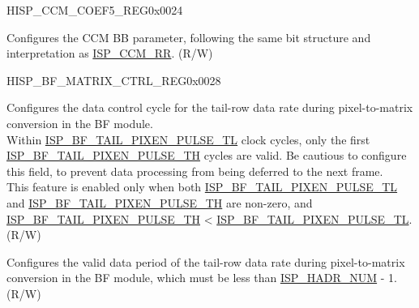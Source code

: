 \begin{register}{H}{ISP\_CCM\_COEF5\_REG}{0x0024}\label{regdesc:ISPCCMCOEF5REG}
%
%
\regnewline%
\begin{regdesc}\begin{reglist}
\label{fielddesc:ISPCCMBB}\item [ISP\_CCM\_BB] Configures the CCM BB parameter, following the same bit structure and interpretation as \hyperref[fielddesc:ISPCCMRR]{ISP\_CCM\_RR}. (R/W)
\end{reglist}\end{regdesc}
\end{register}


\begin{register}{H}{ISP\_BF\_MATRIX\_CTRL\_REG}{0x0028}\label{regdesc:ISPBFMATRIXCTRLREG}
%
%
%
%
%
\regnewline%
\begin{regdesc}\begin{reglist}
\label{fielddesc:ISPBFTAILPIXENPULSETL}\item [ISP\_BF\_TAIL\_PIXEN\_PULSE\_TL] Configures the data control cycle for the tail-row data rate during pixel-to-matrix conversion in the BF module.\\Within \hyperref[fielddesc:ISPBFTAILPIXENPULSETL]{ISP\_BF\_TAIL\_PIXEN\_PULSE\_TL} clock cycles, only the first \hyperref[fielddesc:ISPBFTAILPIXENPULSETH]{ISP\_BF\_TAIL\_PIXEN\_PULSE\_TH} cycles are valid. Be cautious to configure this field, to prevent data processing from being deferred to the next frame.\\This feature is enabled only when both \hyperref[fielddesc:ISPBFTAILPIXENPULSETL]{ISP\_BF\_TAIL\_PIXEN\_PULSE\_TL} and \hyperref[fielddesc:ISPBFTAILPIXENPULSETH]{ISP\_BF\_TAIL\_PIXEN\_PULSE\_TH} are non-zero, and \hyperref[fielddesc:ISPBFTAILPIXENPULSETH]{ISP\_BF\_TAIL\_PIXEN\_PULSE\_TH} < \hyperref[fielddesc:ISPBFTAILPIXENPULSETL]{ISP\_BF\_TAIL\_PIXEN\_PULSE\_TL}. (R/W)
\label{fielddesc:ISPBFTAILPIXENPULSETH}\item [ISP\_BF\_TAIL\_PIXEN\_PULSE\_TH] Configures the valid data period of the tail-row data rate during pixel-to-matrix conversion in the BF module, which must be less than \hyperref[fielddesc:ISPHADRNUM]{ISP\_HADR\_NUM} - 1. (R/W)

\end{reglist}
\end{regdesc}
\end{register}
